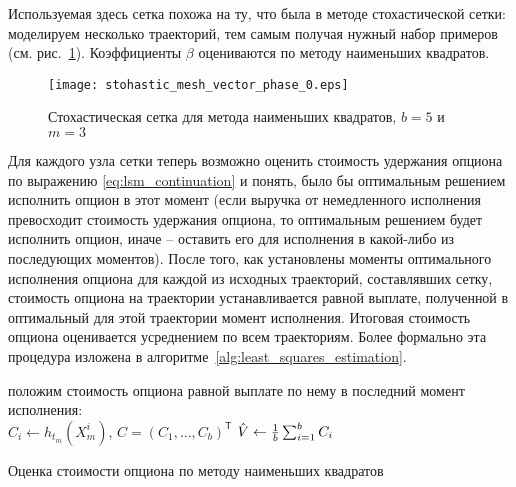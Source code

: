 Используемая здесь сетка похожа на ту, что была в методе стохастической сетки: моделируем несколько траекторий, тем самым получая нужный набор примеров (см. рис.~\ref{fig:least_squares}). Коэффициенты $\beta$ оцениваются по методу наименьших квадратов. 

\begin{figure}[t]
    \centering
    \texttt{[image: stohastic\_mesh\_vector\_phase\_0.eps]}
    \caption{Стохастическая сетка для метода наименьших квадратов, $b = 5$ и $m = 3$}
    \label{fig:least_squares}
\end{figure}

Для каждого узла сетки теперь возможно оценить стоимость удержания опциона по выражению \eqref{eq:lsm_continuation} и понять, было бы оптимальным решением исполнить опцион в этот момент (если выручка от немедленного исполнения превосходит стоимость удержания опциона, то оптимальным решением будет исполнить опцион, иначе -- оставить его для исполнения в какой-либо из последующих моментов). После того, как установлены моменты оптимального исполнения опциона для каждой из исходных траекторий, составлявших сетку, стоимость опциона на траектории устанавливается равной выплате, полученной в оптимальный для этой траектории момент исполнения. Итоговая стоимость опциона оценивается усреднением по всем траекториям. Более формально эта процедура изложена в алгоритме~\ref{alg:least_squares_estimation}.

\begin{algorithm}[h]
    
    положим стоимость опциона равной выплате по нему в последний момент исполнения:\\$C_i \leftarrow h_{t_m}\left(X_m^i\right)$, $C = \left(C_1, \dots, C_b\right)^{\mathsf T}$\;
    $\hat{V} \leftarrow \frac{1}{b}\sum_{i=1}^b C_i$

    \caption{Оценка стоимости опциона по методу наименьших квадратов}
\label{alg:least_squares_estimation}
\end{algorithm}

